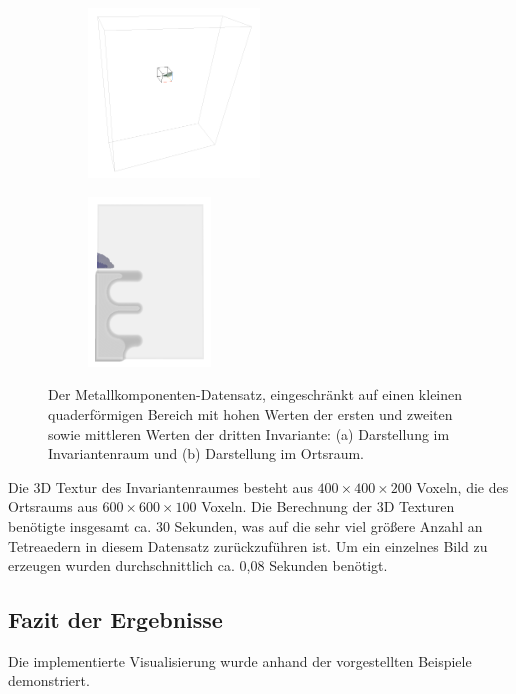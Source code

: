 \documentclass[a4paper,fontsize=12pt,toc=bib,parskip=half,ngerman]{scrartcl}
\begin{document}
\begin{figure}
	\begin{subfigure}{0.49\textwidth}
		\centering
		\includegraphics[height=4.5cm]{pictures/results/Nodel/Nodel_InvariantSpace1.png}
		\subcaption{}
		\label{NodelInvariant1}
	\end{subfigure}
	\hspace*{\fill}
	\begin{subfigure}{0.49\textwidth}
		\centering
		\includegraphics[height=4.5cm]{pictures/results/Nodel/Nodel_Object1.png}
		\subcaption{}
		\label{NodelObject1}
	\end{subfigure}
	\caption{Der Metallkomponenten-Datensatz, eingeschr\"ankt auf einen kleinen quaderf\"ormigen Bereich mit hohen Werten der ersten und zweiten sowie mittleren Werten der dritten Invariante: (a) Darstellung im Invariantenraum und (b) Darstellung im Ortsraum.}
	\label{NodelInteractions}
\end{figure}

Die 3D Textur des Invariantenraumes besteht aus $400\times400\times200$ Voxeln, die des Ortsraums aus $600\times600\times100$ Voxeln. Die Berechnung der 3D Texturen ben\"otigte insgesamt ca. 30 Sekunden, was auf die sehr viel gr\"o{\ss}ere Anzahl an Tetreaedern in diesem Datensatz zur\"uckzuf\"uhren ist. Um ein einzelnes Bild zu erzeugen wurden durchschnittlich ca. 0,08 Sekunden ben\"otigt.

\subsection{Fazit der Ergebnisse}
Die implementierte Visualisierung wurde anhand der vorgestellten Beispiele demonstriert. 
\end{document}
